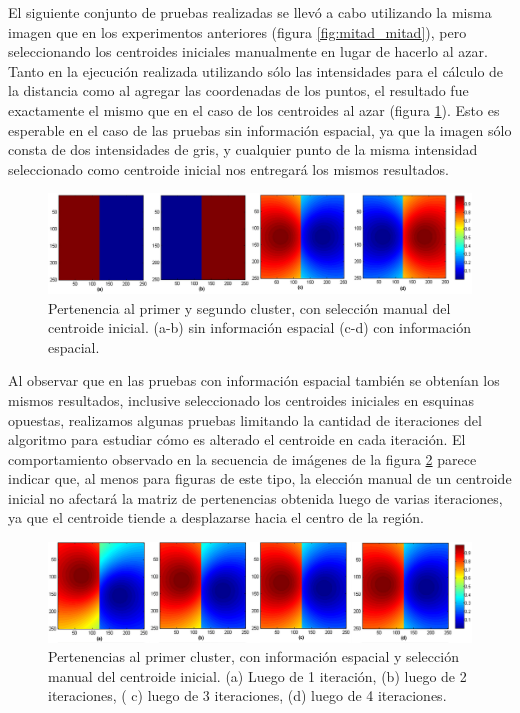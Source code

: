 El siguiente conjunto de pruebas realizadas se llevó a cabo utilizando la misma imagen que en los experimentos anteriores (figura \ref{fig:mitad_mitad}), pero seleccionando los centroides iniciales manualmente en lugar de hacerlo al azar. Tanto en la ejecución realizada utilizando sólo las intensidades para el cálculo de la distancia como al agregar las coordenadas de los puntos, el resultado fue exactamente el mismo que en el caso de los centroides al azar (figura \ref{fig:ejecucion_mitad_mitad_centroides_manuales}). Esto es esperable en el caso de las pruebas sin información espacial, ya que la imagen sólo consta de dos intensidades de gris, y cualquier punto de la misma intensidad seleccionado como centroide inicial nos entregará los mismos resultados.

\begin{figure}[h]
\centering
\includegraphics[scale=0.08]{images/mitad_mitad_001.jpg}
\caption{Pertenencia al primer y segundo cluster, con selección manual del centroide inicial. (a-b) sin información espacial (c-d) con información espacial.}
\label{fig:ejecucion_mitad_mitad_centroides_manuales}
\end{figure}

Al observar que en las pruebas con información espacial también se obtenían los mismos resultados, inclusive  seleccionado los centroides iniciales en esquinas opuestas, realizamos algunas pruebas limitando la cantidad de iteraciones del algoritmo para estudiar cómo es alterado el centroide en cada iteración. El comportamiento observado en la secuencia de imágenes de la figura \ref{fig:ejecucion_mitad_mitad_iteraciones} parece indicar que, al menos para figuras de este tipo, la elección manual de un centroide inicial no afectará la matriz de pertenencias obtenida luego de varias iteraciones, ya que el centroide tiende a desplazarse hacia el centro de la región.

\begin{figure}[h]
\centering
\includegraphics[scale=0.08]{images/mitad_mitad_iteracion_x1.jpg}
\caption{Pertenencias al primer cluster, con información espacial y selección manual del centroide inicial. (a) Luego de 1 iteración, (b) luego de 2 iteraciones, ( c) luego de 3 iteraciones, (d) luego de 4 iteraciones.}
\label{fig:ejecucion_mitad_mitad_iteraciones}
\end{figure}

